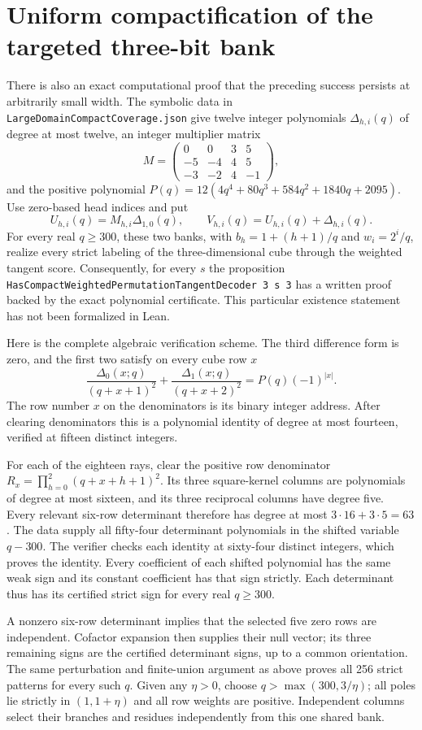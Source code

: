 \documentclass[11pt]{article}
\begin{document}
\section{Uniform compactification of the targeted three-bit bank}
There is also an exact computational proof that the preceding success
persists at arbitrarily small width. The symbolic data in
\texttt{LargeDomainCompactCoverage.json} give twelve integer polynomials
$\Delta_{h,i}(q)$ of degree at most twelve, an integer multiplier matrix
\[
 M=\begin{pmatrix}0&0&3&5\\-5&-4&4&5\\-3&-2&4&-1\end{pmatrix},
\]
and the positive polynomial
$P(q)=12(4q^4+80q^3+584q^2+1840q+2095)$.
Use zero-based head indices and put
\[
 U_{h,i}(q)=M_{h,i}\Delta_{1,0}(q),\qquad
 V_{h,i}(q)=U_{h,i}(q)+\Delta_{h,i}(q).
\]
For every real $q\geq300$, these two banks, with
$b_h=1+(h+1)/q$ and $w_i=2^i/q$, realize every strict labeling of the
three-dimensional cube through the weighted tangent score.
Consequently, for every $s$ the proposition
\texttt{HasCompactWeightedPermutationTangentDecoder 3 s 3}
has a written proof backed by the exact polynomial certificate. This
particular existence statement has not been formalized in Lean.

Here is the complete algebraic verification scheme. The third difference
form is zero, and the first two satisfy on every cube row $x$
\[
 \frac{\Delta_0(x;q)}{(q+x+1)^2}
 +\frac{\Delta_1(x;q)}{(q+x+2)^2}
 =P(q)(-1)^{|x|}.
\]
The row number $x$ on the denominators is its binary integer address.
After clearing denominators this is a polynomial identity of degree at
most fourteen, verified at fifteen distinct integers.

For each of the eighteen rays, clear the positive row denominator
$R_x=\prod_{h=0}^2(q+x+h+1)^2$. Its three square-kernel columns are
polynomials of degree at most sixteen, and its three reciprocal columns
have degree five. Every relevant six-row determinant therefore has degree
at most $3\cdot16+3\cdot5=63$. The data supply all fifty-four determinant
polynomials in the shifted variable $q-300$. The verifier checks each
identity at sixty-four distinct integers, which proves the identity.
Every coefficient of each shifted polynomial has the same weak sign and
its constant coefficient has that sign strictly. Each determinant thus
has its certified strict sign for every real $q\geq300$.

A nonzero six-row determinant implies that the selected five zero rows
are independent. Cofactor expansion then supplies their null vector;
its three remaining signs are the certified determinant signs, up to a
common orientation. The same perturbation and finite-union argument as
above proves all 256 strict patterns for every such $q$. Given any
$\eta>0$, choose $q>\max(300,3/\eta)$; all poles lie strictly in
$(1,1+\eta)$ and all row weights are positive. Independent columns select
their branches and residues independently from this one shared bank.
\end{document}
